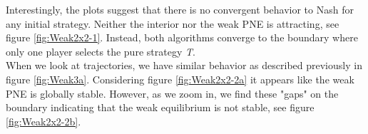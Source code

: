 Interestingly, the plots suggest that there is no convergent behavior to Nash for any initial strategy. Neither the interior nor the weak PNE is attracting, see figure \ref{fig:Weak2x2-1}. Instead, both algorithms converge to the boundary where only one player selects the pure strategy \textit{T}. \\

When we look at trajectories, we have similar behavior as described previously in figure \ref{fig:Weak3a}. Considering figure \ref{fig:Weak2x2-2a} it appears like the weak PNE is globally stable. However, as we zoom in, we find these "gaps" on the boundary indicating that the weak equilibrium is not stable, see figure \ref{fig:Weak2x2-2b}.







